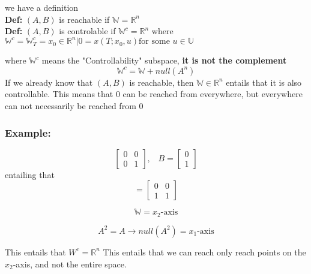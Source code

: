 \documentclass[a4paper]{article}
\begin{document}
\raggedright

we have a definition\\
\textbf{Def:} $ (A,B) $ is reachable if  $ \mathbb{W} = \mathbb{R}^{n}  $ \\
\textbf{Def:} $ (A,B) $ is controlable if $ \mathbb{W}^{c}= \mathbb{R}^{n} $ where $ \mathbb{W}^{c} = \mathbb{W}_T^{c} = {x_0 \in \mathbb{R}^{n} | 0 = x(T; x_0, u) } \text{for some } u \in \mathbb{U}$

where $ \mathbb{W}^{c} $ means the "Controllability" subspace, \textbf{it is not the complement} 
\begin{equation}
	\mathbb{W}^{c} = \mathbb{W} + null(A^{n})
\end{equation}
If we already know that $ (A,B) $ is reachable, then $ \mathbb{W} \in \mathbb{R}^{n} $ entails that it is also controllable. This means that $ 0 $ can be reached from everywhere, but everywhere can not necessarily be reached from  $ 0 $

\subsubsection{Example:}
\begin{equation}
\begin{bmatrix}
0 & 0 \\
0 & 1
\end{bmatrix}, \hspace{10pt} B = \begin{bmatrix}
0 \\
1
\end{bmatrix}
\end{equation}
entailing that
\begin{equation}
	[A|B] = \begin{bmatrix}
	0 & 0 \\
	1 & 1
	\end{bmatrix}
\end{equation}

\begin{equation}
 \mathbb{W} = x_2\text{-axis}
\end{equation}

\begin{equation} \label{eq2}
A^{2} = A \rightarrow null(A^{2}) = x_1\text{-axis}
\end{equation}

This entails that $ W^{c} = \mathbb{R}^{n} $ 
This entails that we can reach only reach points on the $ x_2$-axis, and not the entire space.
\end{document}
